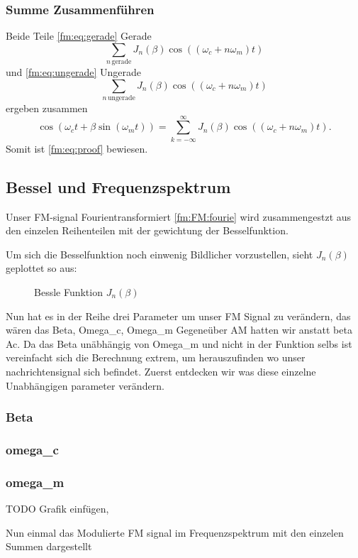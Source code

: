 \subsubsection{Summe Zusammenführen}
Beide Teile \eqref{fm:eq:gerade} Gerade 
\[
    \sum_{n\, \text{gerade}} J_{n}(\beta) \cos((\omega_c + n\omega_m) t)
\]
und \eqref{fm:eq:ungerade} Ungerade 
\[
    \sum_{n\, \text{ungerade}} J_{n}(\beta) \cos((\omega_c + n\omega_m) t)
\]
ergeben zusammen
\[
    \cos(\omega_ct+\beta\sin(\omega_mt))
    =
    \sum_{k= -\infty}^\infty J_{n}(\beta) \cos((\omega_c+ n\omega_m)t).
\]
Somit ist \eqref{fm:eq:proof} bewiesen.
\newpage
\subsection{Bessel und Frequenzspektrum}
Unser FM-signal Fourientransformiert \eqref{fm:FM:fourie} wird zusammengestzt aus den einzelen Reihenteilen mit der gewichtung der Besselfunktion.

Um sich die Besselfunktion noch einwenig Bildlicher vorzustellen, sieht \(J_{n}(\beta)\) geplottet so aus:
\begin{figure}
	\centering
	
	\caption{Bessle Funktion \(J_{n}(\beta)\)}
	\label{fig:bessel}
\end{figure}

Nun hat es in der Reihe drei Parameter um unser FM Signal zu verändern, das wären das Beta, Omega_c, Omega_m
Gegeneüber AM hatten wir anstatt beta Ac. 
Da das Beta unäbhängig von Omega_m und nicht in der Funktion selbs ist vereinfacht sich die Berechnung extrem, um herauszufinden wo unser nachrichtensignal sich befindet.
Zuerst entdecken wir was diese einzelne Unabhängigen parameter verändern.
\subsubsection{Beta}
\subsubsection{omega_c}
\subsubsection{omega_m}

TODO Grafik einfügen,

Nun einmal das Modulierte FM signal im Frequenzspektrum mit den einzelen Summen dargestellt

